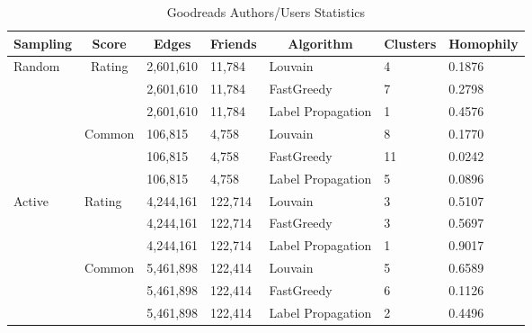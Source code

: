 \documentclass[11pt]{article}
\begin{document}
\begin{table}[h]
\begin{tabular}{|l|l|l|l|l|l|l|}
\hline
\multicolumn{1}{|c|}{\textbf{Sampling}} & \multicolumn{1}{c|}{\textbf{Score}} & \multicolumn{1}{c|}{\textbf{Edges}} & \multicolumn{1}{c|}{\textbf{Friends}} & \multicolumn{1}{c|}{\textbf{Algorithm}} & \multicolumn{1}{c|}{\textbf{Clusters}} & \multicolumn{1}{c|}{\textbf{Homophily}} \\ \hline
\multirow{6}{*}{Random} & \multicolumn{1}{c|}{\multirow{3}{*}{Rating}} & 2,601,610 & 11,784 & Louvain & 4 & 0.1876 \\ \cline{3-7} 
 & \multicolumn{1}{c|}{} & 2,601,610 & 11,784 & FastGreedy & 7 & 0.2798 \\ \cline{3-7} 
 & \multicolumn{1}{c|}{} & 2,601,610 & 11,784 & Label Propagation & 1 & 0.4576 \\ \cline{2-7} 
 & \multirow{3}{*}{Common} & 106,815 & 4,758 & Louvain & 8 & 0.1770 \\ \cline{3-7} 
 &  & 106,815 & 4,758 & FastGreedy & 11 & 0.0242 \\ \cline{3-7} 
 &  & 106,815 & 4,758 & Label Propagation & 5 & 0.0896 \\ \hline
\multirow{6}{*}{Active} & \multirow{3}{*}{Rating} & 4,244,161 & 122,714 & Louvain & 3 & 0.5107 \\ \cline{3-7} 
 &  & 4,244,161 & 122,714 & FastGreedy & 3 & 0.5697 \\ \cline{3-7} 
 &  & 4,244,161 & 122,714 & Label Propagation & 1 & 0.9017 \\ \cline{2-7} 
 & \multirow{3}{*}{Common} & 5,461,898 & 122,414 & Louvain & 5 & 0.6589 \\ \cline{3-7} 
 &  & 5,461,898 & 122,414 & FastGreedy & 6 & 0.1126 \\ \cline{3-7} 
 &  & 5,461,898 & 122,414 & Label Propagation & 2 & 0.4496 \\ \hline
\end{tabular}
\caption{Goodreads Authors/Users Statistics}
\label{table:analysis_stat}
\end{table}

\end{document}
